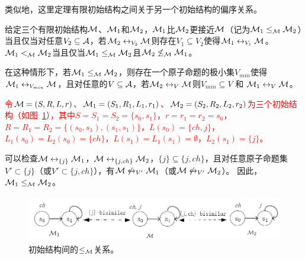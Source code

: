类似地，这里定理有限初始结构之间关于另一个初始结构的偏序关系。
\begin{definition}\label{def:closer}
	给定三个有限初始结构${\cal M}$、${\cal M}_1$和${\cal M}_2$，${\cal M}_1$比${\cal M}_2$更接近${\cal M}$（记为${\cal M}_1 \leq_{{\cal M}} {\cal M}_2$）当且仅当对任意$V_2 \subseteq \mathcal{A}$，若${\cal M}_2 \leftrightarrow_{V_2} {\cal M}$则存在$V_1 \subseteq V_2$使得${\cal M}_1 \leftrightarrow_{V_1} {\cal M}$。
	${\cal M}_1 <_{{\cal M}} {\cal M}_2$当且仅当${\cal M}_1 \leq_{{\cal M}} {\cal M}_2$且${\cal M}_2 \not \leq_{{\cal M}} {\cal M}_1$。
\end{definition}

在这种情形下，若${\cal M}_1 \leq_{{\cal M}} {\cal M}_2$，则存在一个原子命题的极小集$V_{min}$使得${\cal M}_1 \leftrightarrow_{V_{min}} {\cal M}$，且对任意的$V\subseteq {\cal A}$，若${\cal M}_2 \leftrightarrow_V {\cal M}$则$V_{min}\subseteq V$ 和 ${\cal M}_1 \leftrightarrow_V {\cal M}$。
\begin{example}
	\textcolor{red}{令${\cal M}= (S, R, L, r)$、${\cal M}_1 = (S_1, R_1, L_1, r_1)$、${\cal M}_2 = (S_2, R_2, L_2, r_2)$为三个初始结构（如图~\ref{fig:partialo}），其中$S = S_1 = S_2 = \{s_0, s_1\}$，$r=r_1=r_2= s_0$，$R=R_1=R_2=\{(s_0, s_1), (s_1, s_1)\}$，$L(s_0) = \{ch, j\}$，$L_1(s_0) = L_2(s_0) = \{ch\}$，$L(s_1) = L_1(s_1)=\emptyset$，$L_2(s_1) = \{j\}$。}
	
	可以检查${\cal M} \leftrightarrow_{\{j\}} {\cal M}_1$，${\cal M} \leftrightarrow_{\{j,ch\}} {\cal M}_2$，$\{j\}\subseteq \{j,ch\}$，且对任意原子命题集$V' \subset \{j\}$（或$V' \subset \{j,ch\}$），有${\cal M} \not\leftrightarrow_{V'} {\cal M}_1$（或${\cal M} \not \leftrightarrow_{V'} {\cal M}_2$）。
	因此，${\cal M}_1 \leq_{{\cal M}} {\cal M}_2$。
	\begin{figure}[h]%
		\centering
		\includegraphics[width=12cm,height=2cm]{figures/chapter06/partial_order.png}
		\caption{初始结构间的$\leq_{{\cal M}}$关系。}\label{fig:partialo}
		
	\end{figure}
\end{example}

